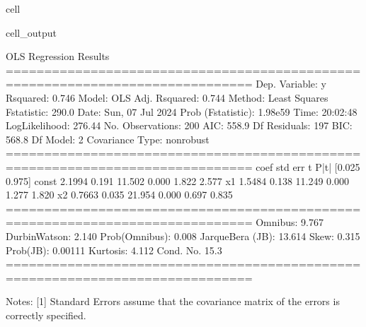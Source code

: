 \documentclass[letterpaper,10pt,english]{jupyterBook}
\begin{document}
\begin{sphinxuseclass}{cell}
\begin{sphinxVerbatimOutput}
\begin{sphinxuseclass}{cell_output}
\begin{sphinxVerbatim}[commandchars=\\\{\}]
                            OLS Regression Results                            
==============================================================================
Dep. Variable:                      y   R\PYGZhy{}squared:                       0.746
Model:                            OLS   Adj. R\PYGZhy{}squared:                  0.744
Method:                 Least Squares   F\PYGZhy{}statistic:                     290.0
Date:                Sun, 07 Jul 2024   Prob (F\PYGZhy{}statistic):           1.98e\PYGZhy{}59
Time:                        20:02:48   Log\PYGZhy{}Likelihood:                \PYGZhy{}276.44
No. Observations:                 200   AIC:                             558.9
Df Residuals:                     197   BIC:                             568.8
Df Model:                           2                                         
Covariance Type:            nonrobust                                         
==============================================================================
                 coef    std err          t      P\PYGZgt{}|t|      [0.025      0.975]
\PYGZhy{}\PYGZhy{}\PYGZhy{}\PYGZhy{}\PYGZhy{}\PYGZhy{}\PYGZhy{}\PYGZhy{}\PYGZhy{}\PYGZhy{}\PYGZhy{}\PYGZhy{}\PYGZhy{}\PYGZhy{}\PYGZhy{}\PYGZhy{}\PYGZhy{}\PYGZhy{}\PYGZhy{}\PYGZhy{}\PYGZhy{}\PYGZhy{}\PYGZhy{}\PYGZhy{}\PYGZhy{}\PYGZhy{}\PYGZhy{}\PYGZhy{}\PYGZhy{}\PYGZhy{}\PYGZhy{}\PYGZhy{}\PYGZhy{}\PYGZhy{}\PYGZhy{}\PYGZhy{}\PYGZhy{}\PYGZhy{}\PYGZhy{}\PYGZhy{}\PYGZhy{}\PYGZhy{}\PYGZhy{}\PYGZhy{}\PYGZhy{}\PYGZhy{}\PYGZhy{}\PYGZhy{}\PYGZhy{}\PYGZhy{}\PYGZhy{}\PYGZhy{}\PYGZhy{}\PYGZhy{}\PYGZhy{}\PYGZhy{}\PYGZhy{}\PYGZhy{}\PYGZhy{}\PYGZhy{}\PYGZhy{}\PYGZhy{}\PYGZhy{}\PYGZhy{}\PYGZhy{}\PYGZhy{}\PYGZhy{}\PYGZhy{}\PYGZhy{}\PYGZhy{}\PYGZhy{}\PYGZhy{}\PYGZhy{}\PYGZhy{}\PYGZhy{}\PYGZhy{}\PYGZhy{}\PYGZhy{}
const          2.1994      0.191     11.502      0.000       1.822       2.577
x1             1.5484      0.138     11.249      0.000       1.277       1.820
x2             0.7663      0.035     21.954      0.000       0.697       0.835
==============================================================================
Omnibus:                        9.767   Durbin\PYGZhy{}Watson:                   2.140
Prob(Omnibus):                  0.008   Jarque\PYGZhy{}Bera (JB):               13.614
Skew:                           0.315   Prob(JB):                      0.00111
Kurtosis:                       4.112   Cond. No.                         15.3
==============================================================================

Notes:
[1] Standard Errors assume that the covariance matrix of the errors is correctly specified.
\end{sphinxVerbatim}

\end{sphinxuseclass}\end{sphinxVerbatimOutput}

\end{sphinxuseclass}
\end{document}
